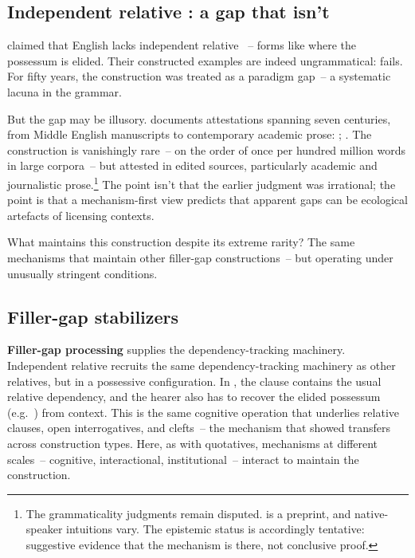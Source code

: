 \subsection{Independent relative : a gap that isn't}
\label{sec:6:independent-whose}

\textcite{hankamer1973whose} claimed that English lacks independent relative ~-- forms like  where the possessum is elided. Their constructed examples are indeed ungrammatical:  fails. For fifty years, the construction was treated as a paradigm gap~-- a systematic lacuna in the grammar.

But the gap may be illusory. \textcite{reynolds2024whose} documents attestations spanning seven centuries, from Middle English manuscripts to contemporary academic prose: ; . The construction is vanishingly rare~-- on the order of once per hundred million words in large corpora~-- but attested in edited sources, particularly academic and journalistic prose.\footnote{The grammaticality judgments remain disputed. \textcite{reynolds2024whose} is a preprint, and native-speaker intuitions vary. The epistemic status is accordingly tentative: suggestive evidence that the mechanism is there, not conclusive proof.} The point isn't that the earlier judgment was irrational; the point is that a mechanism-first view predicts that apparent gaps can be ecological artefacts of licensing contexts.

What maintains this construction despite its extreme rarity? The same mechanisms that maintain other filler-gap constructions~-- but operating under unusually stringent conditions.

\subsection{Filler-gap stabilizers}
\label{sec:6:filler-gap-stabilizers}

\textbf{Filler-gap processing} supplies the dependency-tracking machinery. Independent relative  recruits the same dependency-tracking machinery as other relatives, but in a possessive configuration. In , the clause contains the usual relative dependency, and the hearer also has to recover the elided possessum (e.g.\ ) from context. This is the same cognitive operation that underlies relative clauses, open interrogatives, and clefts~-- the mechanism that \textcite{boguraev2025} showed transfers across construction types. Here, as with quotatives, mechanisms at different scales~-- cognitive, interactional, institutional~-- interact to maintain the construction.

